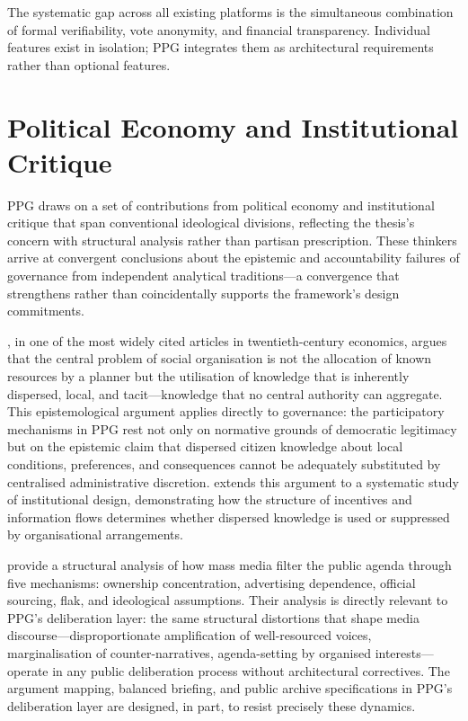 \documentclass[12pt,a4paper,oneside]{report}
\begin{document}
The systematic gap across all existing platforms is the simultaneous combination of formal verifiability, vote anonymity, and financial transparency. Individual features exist in isolation; PPG integrates them as architectural requirements rather than optional features.

\section{Political Economy and Institutional Critique}

PPG draws on a set of contributions from political economy and institutional critique that span conventional ideological divisions, reflecting the thesis's concern with structural analysis rather than partisan prescription. These thinkers arrive at convergent conclusions about the epistemic and accountability failures of governance from independent analytical traditions---a convergence that strengthens rather than coincidentally supports the framework's design commitments.

\citet{hayek1945use}, in one of the most widely cited articles in twentieth-century economics, argues that the central problem of social organisation is not the allocation of known resources by a planner but the utilisation of knowledge that is inherently dispersed, local, and tacit---knowledge that no central authority can aggregate. This epistemological argument applies directly to governance: the participatory mechanisms in PPG rest not only on normative grounds of democratic legitimacy but on the epistemic claim that dispersed citizen knowledge about local conditions, preferences, and consequences cannot be adequately substituted by centralised administrative discretion. \citet{sowell1980knowledge} extends this argument to a systematic study of institutional design, demonstrating how the structure of incentives and information flows determines whether dispersed knowledge is used or suppressed by organisational arrangements.

\citet{herman1988manufacturing} provide a structural analysis of how mass media filter the public agenda through five mechanisms: ownership concentration, advertising dependence, official sourcing, flak, and ideological assumptions. Their analysis is directly relevant to PPG's deliberation layer: the same structural distortions that shape media discourse---disproportionate amplification of well-resourced voices, marginalisation of counter-narratives, agenda-setting by organised interests---operate in any public deliberation process without architectural correctives. The argument mapping, balanced briefing, and public archive specifications in PPG's deliberation layer are designed, in part, to resist precisely these dynamics.
\end{document}
